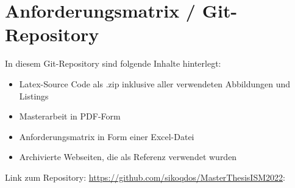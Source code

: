 \chapter{Anforderungsmatrix / Git-Repository}
In diesem Git-Repository sind folgende Inhalte hinterlegt:

\begin{itemize}
    \item Latex-Source Code als .zip inklusive aller verwendeten Abbildungen und Listings
    \item Masterarbeit in PDF-Form
    \item Anforderungsmatrix in Form einer Excel-Datei
    \item Archivierte Webseiten, die als Referenz verwendet wurden
\end{itemize}
\bigbreak
Link zum Repository: {\url{https://github.com/sikoqdos/MasterThesisISM2022}}: